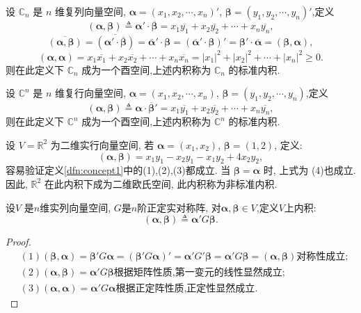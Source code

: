 \begin{example}\label{exl:concept2}
  设 \(\mathbb{C}_n\) 是 \(n\) 维复列向量空间, \(\bm{\alpha} = (x_1, x_2, \cdots, x_n)'\), 
  \(\bm{\beta} = (y_1, y_2, \cdots, y_n)'\),定义
\[
  (\bm{\alpha}, \bm{\beta}) \triangleq \bm{\alpha}'\cdot\overline{\bm{\beta}}
  = x_1\overline{y_1} + x_2\overline{y_2} + \cdots + x_n\overline{y_n},
\]
\[ \overline{(\bm{\alpha},\bm{\beta})}=\overline{(\bm{\alpha}'\cdot\overline{\bm{\beta}})}
  =\overline{\bm{\alpha}}'\cdot\bm{\beta}
  =(\overline{\bm{\alpha}}'\cdot\bm{\beta})'
  =\bm{\beta}'\cdot\overline{\bm{\alpha}}
  =(\bm{\beta},\bm{\alpha}),
\]
\[
  (\bm{\alpha}, \bm{\alpha}) = x_1\overline{x_1} + x_2\overline{x_2} + \cdots + x_n\overline{x_n}
  = |x_1|^2 + |x_2|^2 + \cdots + |x_n|^2 \geq 0.
\]
则在此定义下 \(\mathbb{C}_n\) 成为一个酉空间,上述内积称为 \(\mathbb{C}_n\) 的标准内积.

设 \(\mathbb{C}^n\) 是 \(n\) 维复行向量空间, \(\bm{\alpha} = (x_1, x_2, \cdots, x_n)\), 
  \(\bm{\beta} = (y_1, y_2, \cdots, y_n)\),定义
\[
  (\bm{\alpha}, \bm{\beta}) \triangleq \bm{\alpha}\cdot\overline{\bm{\beta}}'
  = x_1\overline{y_1} + x_2\overline{y_2} + \cdots + x_n\overline{y_n},
\]
则在此定义下 \(\mathbb{C}^n\) 成为一个酉空间,上述内积称为 \(\mathbb{C}^n\) 的标准内积.
\end{example}

\begin{example}\label{exl:concept3}
  设 $V = \mathbb{R}^2$ 为二维实行向量空间,
  若 $\bm{\alpha} = (x_1, x_2)$, $\bm{\beta} = (1, 2)$,
  定义:
  \[
    (\bm{\alpha}, \bm{\beta}) = x_1y_1-x_2y_1-x_1y_2 +4x_2y_2,
  \]
  容易验证定义\ref{dfn:concept1}中的(1),(2),(3)都成立.
  当 $\bm{\beta} = \bm{\alpha}$ 时, 上式为 (4)也成立.
  因此, $\mathbb{R}^2$ 在此内积下成为二维欧氏空间,
  此内积称为{\heiti 非标准内积}.
\end{example}

\begin{example}\label{exl:concept4}
  设\(V\) 是\(n\)维实列向量空间, \(G\)是\(n\)阶正定实对称阵,
  对\(\bm{\alpha},\bm{\beta} \in V\),定义$V$上内积:
\[
(\bm{\alpha}, \bm{\beta}) \triangleq \bm{\alpha}'G\bm{\beta}.
\]
\end{example}

\begin{proof}
  \begin{align*}
    & (1) (\bm{\beta}, \bm{\alpha}) = \bm{\beta}'G\bm{\alpha} =
    (\bm{\beta}'G\bm{\alpha})'= \bm{\alpha}'G'\bm{\beta} =
      \bm{\alpha}'G\bm{\beta}=(\bm{\alpha},\bm{\beta}) \text{对称性成立};\\
    & (2) (\bm{\alpha}, \bm{\beta}) = \bm{\alpha}'G\bm{\beta} \text{根据矩阵性质,第一变元的线性显然成立};\\
    & (3) (\bm{\alpha},\bm{\alpha})= \bm{\alpha}'G\bm{\alpha} \text{根据正定阵性质,正定性显然成立}.
\end{align*}
\end{proof}

